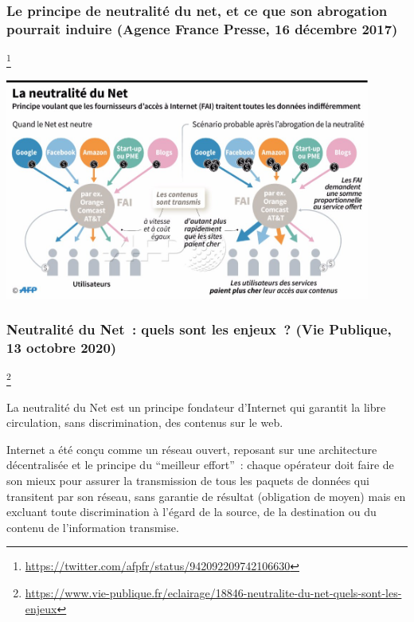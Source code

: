 \documentclass[11pt]{article}
\begin{document}
\subsubsection{Le principe de neutralité du net, et ce que son abrogation pourrait induire (Agence France Presse, 16 décembre 2017)}\footnote{\url{https://twitter.com/afpfr/status/942092209742106630}}

\begin{center}
  \includegraphics[width=12cm]{neutralite.png}
\end{center}

\subsubsection{Neutralité du Net : quels sont les enjeux ? (Vie Publique, 13 octobre 2020)}\footnote{\url{https://www.vie-publique.fr/eclairage/18846-neutralite-du-net-quels-sont-les-enjeux}}

La neutralité du Net est un principe fondateur d'Internet qui garantit la libre circulation, sans discrimination, des contenus sur le web. %

Internet a été conçu comme un réseau ouvert, reposant sur une architecture décentralisée et le principe du \enquote{meilleur effort} : chaque opérateur doit faire de son mieux pour assurer la transmission de tous les paquets de données qui transitent par son réseau, sans garantie de résultat (obligation de moyen) mais en excluant toute discrimination à l'égard de la source, de la destination ou du contenu de l'information transmise.
\end{document}
